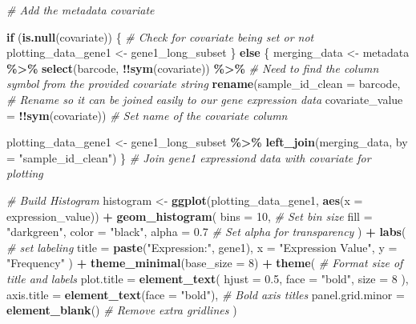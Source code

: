 \documentclass[
]{article}
\newenvironment{Shaded}{\begin{snugshade}}{\end{snugshade}}
\newcommand{\AttributeTok}[1]{\textcolor[rgb]{0.13,0.29,0.53}{#1}}
\newcommand{\CommentTok}[1]{\textcolor[rgb]{0.56,0.35,0.01}{\textit{#1}}}
\newcommand{\ControlFlowTok}[1]{\textcolor[rgb]{0.13,0.29,0.53}{\textbf{#1}}}
\newcommand{\DecValTok}[1]{\textcolor[rgb]{0.00,0.00,0.81}{#1}}
\newcommand{\FloatTok}[1]{\textcolor[rgb]{0.00,0.00,0.81}{#1}}
\newcommand{\FunctionTok}[1]{\textcolor[rgb]{0.13,0.29,0.53}{\textbf{#1}}}
\newcommand{\NormalTok}[1]{#1}
\newcommand{\OtherTok}[1]{\textcolor[rgb]{0.56,0.35,0.01}{#1}}
\newcommand{\SpecialCharTok}[1]{\textcolor[rgb]{0.81,0.36,0.00}{\textbf{#1}}}
\newcommand{\StringTok}[1]{\textcolor[rgb]{0.31,0.60,0.02}{#1}}
\begin{document}
\begin{Shaded}
\begin{Highlighting}[]
  \CommentTok{\# Add the metadata covariate}
  
  \ControlFlowTok{if}\NormalTok{ (}\FunctionTok{is.null}\NormalTok{(covariate)) \{ }\CommentTok{\# Check for covariate being set or not}
\NormalTok{  plotting\_data\_gene1 }\OtherTok{\textless{}{-}}\NormalTok{ gene1\_long\_subset}
\NormalTok{  \} }\ControlFlowTok{else}\NormalTok{ \{}
\NormalTok{  merging\_data }\OtherTok{\textless{}{-}}\NormalTok{ metadata }\SpecialCharTok{\%\textgreater{}\%}
    \FunctionTok{select}\NormalTok{(barcode, }\SpecialCharTok{!!}\FunctionTok{sym}\NormalTok{(covariate)) }\SpecialCharTok{\%\textgreater{}\%} \CommentTok{\# Need to find the column symbol from the provided covariate string}
    \FunctionTok{rename}\NormalTok{(}\AttributeTok{sample\_id\_clean =}\NormalTok{ barcode, }\CommentTok{\# Rename so it can be joined easily to our gene expression data}
           \AttributeTok{covariate\_value =} \SpecialCharTok{!!}\FunctionTok{sym}\NormalTok{(covariate)) }\CommentTok{\# Set name of the covariate column }

\NormalTok{  plotting\_data\_gene1 }\OtherTok{\textless{}{-}}\NormalTok{ gene1\_long\_subset }\SpecialCharTok{\%\textgreater{}\%}
    \FunctionTok{left\_join}\NormalTok{(merging\_data, }\AttributeTok{by =} \StringTok{"sample\_id\_clean"}\NormalTok{)}
\NormalTok{  \} }\CommentTok{\# Join gene1 expressiond data with covariate for plotting}
  
  \CommentTok{\# Build Histogram}
\NormalTok{  histogram }\OtherTok{\textless{}{-}} \FunctionTok{ggplot}\NormalTok{(plotting\_data\_gene1, }\FunctionTok{aes}\NormalTok{(}\AttributeTok{x =}\NormalTok{ expression\_value)) }\SpecialCharTok{+} 
    \FunctionTok{geom\_histogram}\NormalTok{(}
      \AttributeTok{bins =} \DecValTok{10}\NormalTok{, }\CommentTok{\# Set bin size}
      \AttributeTok{fill =} \StringTok{"darkgreen"}\NormalTok{,}
      \AttributeTok{color =} \StringTok{"black"}\NormalTok{,}
      \AttributeTok{alpha =} \FloatTok{0.7} \CommentTok{\# Set alpha for transparency}
\NormalTok{    ) }\SpecialCharTok{+}
    \FunctionTok{labs}\NormalTok{( }\CommentTok{\# set labeling}
      \AttributeTok{title =} \FunctionTok{paste}\NormalTok{(}\StringTok{"Expression:"}\NormalTok{, gene1),}
      \AttributeTok{x =} \StringTok{"Expression Value"}\NormalTok{,}
      \AttributeTok{y =} \StringTok{"Frequency"}
\NormalTok{    ) }\SpecialCharTok{+}
   \FunctionTok{theme\_minimal}\NormalTok{(}\AttributeTok{base\_size =} \DecValTok{8}\NormalTok{) }\SpecialCharTok{+}
    \FunctionTok{theme}\NormalTok{( }\CommentTok{\# Format size of title and labels}
      \AttributeTok{plot.title =} \FunctionTok{element\_text}\NormalTok{(}
        \AttributeTok{hjust =} \FloatTok{0.5}\NormalTok{,}
        \AttributeTok{face =} \StringTok{"bold"}\NormalTok{,}
        \AttributeTok{size =} \DecValTok{8}
\NormalTok{      ),}
      \AttributeTok{axis.title =} \FunctionTok{element\_text}\NormalTok{(}\AttributeTok{face =} \StringTok{"bold"}\NormalTok{), }\CommentTok{\# Bold axis titles}
      \AttributeTok{panel.grid.minor =} \FunctionTok{element\_blank}\NormalTok{() }\CommentTok{\# Remove extra gridlines}
\NormalTok{  )}
  

\end{Highlighting}
\end{Shaded}
\end{document}
